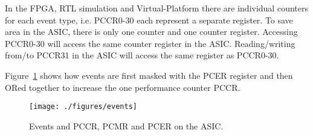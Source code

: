 In the FPGA, RTL simulation and Virtual-Platform there are individual counters
for each event type, i.e. PCCR0-30 each represent a separate register.
To save area in the ASIC, there is only one counter and one counter register.
Accessing PCCR0-30 will access the same counter register in the ASIC.
Reading/writing from/to PCCR31 in the ASIC will access the same register as
PCCR0-30.

Figure~\ref{fig:events} shows how events are first masked with the PCER register
and then ORed together to increase the one performance counter PCCR.

\begin{figure}[H]
  \centering
  \texttt{[image: ./figures/events]}
  \caption{Events and PCCR, PCMR and PCER on the ASIC.}
  \label{fig:events}
\end{figure}
